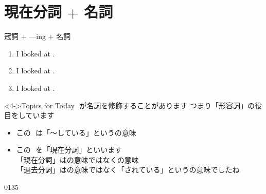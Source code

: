 \documentclass[aspectratio=169,xcolor={dvipsnames,table}]{beamer}
\begin{document}
\section{現在分詞 $+$ 名詞}
\begin{frame}[plain,t]{冠詞 $+$ ---ing $+$ 名詞}
 \begin{enumerate}
	 \item<1-> I looked at .\hspace{35pt}{\scriptsize look at ～を見る}\hfill{\scriptsize {}}
	 \item<2-> I looked at .\hfill{\scriptsize {}}
	 \item<3-> I looked at .\hfill{\scriptsize {}}
 \end{enumerate}

\vspace{20pt}

\begin{block}<4->{Topics for Today}\small
{}\,\,が名詞を修飾することがあります%
\hfill{\scriptsize つまり「形容詞」の役目をしています}

\begin{itemize}[square]\small
 \item<5-> この\,\,\,\,は「～している」というの意味
 \item<6-> この\,\,\,\,を「現在分詞」といいます\\
{\scriptsize \textdbend\textdbend 「現在分詞」はの意味ではなくの意味}\\
\hfill{\scriptsize 「過去分詞」はの意味ではなく「されている」というの意味でしたね}
 \end{itemize}
     \end{block}
\vspace*{-5pt}

\mbox{}\hfill\tiny 0135{\,}{\scriptsize {}}
\end{frame}
\end{document}
